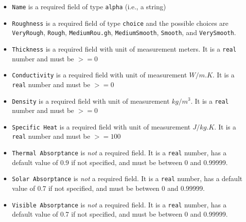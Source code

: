 \documentclass[
]{book}
\providecommand{\tightlist}{%
  \setlength{\itemsep}{0pt}\setlength{\parskip}{0pt}}
\begin{document}
\begin{itemize}
\tightlist
\item
  \texttt{Name} is a required field of type \texttt{alpha} (i.e., a string)
\item
  \texttt{Roughness} is a required field of type \texttt{choice} and the possible choices are \texttt{VeryRough}, \texttt{Rough}, \texttt{MediumRou.gh}, \texttt{MediumSmooth}, \texttt{Smooth}, and \texttt{VerySmooth}.
\item
  \texttt{Thickness} is a required field with unit of measurement meters. It is a \texttt{real} number and must be \(>=0\)
\item
  \texttt{Conductivity} is a required field with unit of measurement \(W/m.K\). It is a \texttt{real} number and must be \(>=0\)
\item
  \texttt{Density} is a required field with unit of measurement \(kg/m^3\). It is a \texttt{real} number and must be \(>=0\)
\item
  \texttt{Specific\ Heat} is a required field with unit of measurement \(J/kg.K\). It is a \texttt{real} number and must be \(>=100\)
\item
  \texttt{Thermal\ Absorptance} is \emph{not} a required field. It is a \texttt{real} number, has a default value of 0.9 if not specified, and must be between 0 and 0.99999.
\item
  \texttt{Solar\ Absorptance} is \emph{not} a required field. It is a \texttt{real} number, has a default value of 0.7 if not specified, and must be between 0 and 0.99999.
\item
  \texttt{Visible\ Absorptance} is \emph{not} a required field. It is a \texttt{real} number, has a default value of 0.7 if not specified, and must be between 0 and 0.99999.
\end{itemize}
\end{document}
